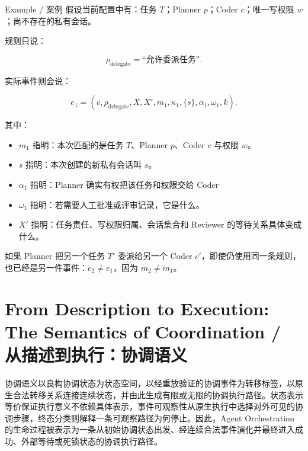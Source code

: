 \begin{MWCallout}[MWCyan]{Example / 案例}
  假设当前配置中有：任务 $T$；Planner $p$；Coder $c$；唯一写权限 $w$；尚不存在的私有会话。

  规则只说：

  \begin{equation}
    \rho_{\mathrm{delegate}}
    =
    \text{“允许委派任务”}.\label{eq:delegate-rule-template}
  \end{equation}

  实际事件则会说：

  \begin{equation}
    \boxed{
      e_1=
      (
        v,
        \rho_{\mathrm{delegate}},
        X, X', m_1, \kappa_1, \{s\}, \alpha_1, \omega_1, k
    ).}\label{eq:delegate-event-instance}
  \end{equation}

  其中：

  \begin{itemize}
    \item $m_1$ 指明：本次匹配的是任务 $T$、Planner $p$、Coder $c$ 与权限 $w$。
    \item ${s}$ 指明：本次创建的新私有会话叫 $s$。
    \item $\alpha_1$ 指明：Planner 确实有权把该任务和权限交给 Coder
    \item $\omega_1$ 指明：若需要人工批准或评审记录，它是什么。
    \item $X'$ 指明：任务责任、写权限归属、会话集合和 Reviewer 的等待关系具体变成什么。
  \end{itemize}

  如果 Planner 把另一个任务 $T'$ 委派给另一个 Coder $c'$，即使仍使用同一条规则，也已经是另一件事件：$e_2\neq e_1$，因为 $m_2\neq m_1$。
\end{MWCallout}



\section{From Description to Execution: The Semantics of Coordination /
从描述到执行：协调语义}

协调语义以良构协调状态为状态空间，以经重放验证的协调事件为转移标签，以原生合法转移关系连接连续状态，并由此生成有限或无限的协调执行路径。状态表示等价保证执行意义不依赖具体表示，事件可观察性从原生执行中选择对外可见的协调步骤，终态分类则解释一条可观察路径为何停止。因此，Agent Orchestration 的生命过程被表示为一条从初始协调状态出发、经连续合法事件演化并最终进入成功、外部等待或死锁状态的协调执行路径。

